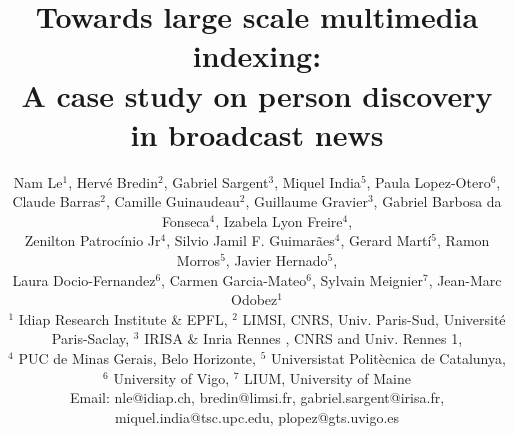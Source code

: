 \documentclass[10pt,conference,a4paper]{IEEEtran}
\begin{document}
%

\title{Towards large scale multimedia indexing: \\ A case study on person discovery in broadcast news}
%


\author{
Nam Le$^1$, Herv\'{e} Bredin$^2$, Gabriel Sargent$^3$, Miquel India$^5$, Paula Lopez-Otero$^6$, \\
Claude Barras$^2$, Camille Guinaudeau$^2$, Guillaume Gravier$^3$, Gabriel Barbosa da Fonseca$^4$, Izabela Lyon Freire$^4$, \\
Zenilton Patroc\'{i}nio Jr$^4$, Silvio Jamil F. Guimarães$^4$, Gerard Martí$^5$, Ramon Morros$^5$, Javier Hernado$^5$, \\
Laura Docio-Fernandez$^6$, Carmen Garcia-Mateo$^6$, Sylvain Meignier$^7$, Jean-Marc Odobez$^1$\\

{\footnotesize $^1$ Idiap Research Institute \& EPFL},
{\footnotesize $^2$ LIMSI, CNRS, Univ. Paris-Sud, Université Paris-Saclay},
{\footnotesize $^3$ IRISA \& Inria Rennes , CNRS and Univ. Rennes 1}, \\
{\footnotesize $^4$ PUC de Minas Gerais, Belo Horizonte},
{\footnotesize $^5$ Universistat Politècnica de Catalunya},
{\footnotesize $^6$ University of Vigo},
{\footnotesize $^7$ LIUM, University of Maine} \\
{\footnotesize Email: nle@idiap.ch, bredin@limsi.fr, gabriel.sargent@irisa.fr, miquel.india@tsc.upc.edu, plopez@gts.uvigo.es}
}

\maketitle



\end{document}
